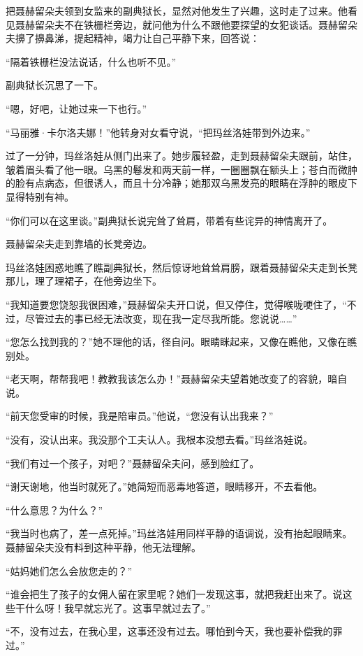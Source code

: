 \documentclass[12pt,UTF-8,openany]{ctexbook}
\begin{document}
\begin{normalsize}
    把聂赫留朵夫领到女监来的副典狱长，显然对他发生了兴趣，这时走了过来。他看见聂赫留朵夫不在铁栅栏旁边，就问他为什么不跟他要探望的女犯谈话。聂赫留朵夫擤了擤鼻涕，提起精神，竭力让自己平静下来，回答说：
    
    “隔着铁栅栏没法说话，什么也听不见。”
    
    副典狱长沉思了一下。
    
    “嗯，好吧，让她过来一下也行。”
    
    “马丽雅·卡尔洛夫娜！”他转身对女看守说，“把玛丝洛娃带到外边来。”
    
    过了一分钟，玛丝洛娃从侧门出来了。她步履轻盈，走到聂赫留朵夫跟前，站住，皱着眉头看了他一眼。乌黑的鬈发和两天前一样，一圈圈飘在额头上；苍白而微肿的脸有点病态，但很诱人，而且十分冷静；她那双乌黑发亮的眼睛在浮肿的眼皮下显得特别有神。
    
    “你们可以在这里谈。”副典狱长说完耸了耸肩，带着有些诧异的神情离开了。
    
    聂赫留朵夫走到靠墙的长凳旁边。
    
    玛丝洛娃困惑地瞧了瞧副典狱长，然后惊讶地耸耸肩膀，跟着聂赫留朵夫走到长凳那儿，理了理裙子，在他旁边坐下。
    
    “我知道要您饶恕我很困难，”聂赫留朵夫开口说，但又停住，觉得喉咙哽住了，“不过，尽管过去的事已经无法改变，现在我一定尽我所能。您说说……”
    
    “您怎么找到我的？”她不理他的话，径自问。眼睛眯起来，又像在瞧他，又像在瞧别处。
    
    “老天啊，帮帮我吧！教教我该怎么办！”聂赫留朵夫望着她改变了的容貌，暗自说。
    
    “前天您受审的时候，我是陪审员。”他说，“您没有认出我来？”
    
    “没有，没认出来。我没那个工夫认人。我根本没想去看。”玛丝洛娃说。
    
    “我们有过一个孩子，对吧？”聂赫留朵夫问，感到脸红了。
    
    “谢天谢地，他当时就死了。”她简短而恶毒地答道，眼睛移开，不去看他。
    
    “什么意思？为什么？”
    
    “我当时也病了，差一点死掉。”玛丝洛娃用同样平静的语调说，没有抬起眼睛来。聂赫留朵夫没有料到这种平静，他无法理解。
    
    “姑妈她们怎么会放您走的？”
    
    “谁会把生了孩子的女佣人留在家里呢？她们一发现这事，就把我赶出来了。说这些干什么呀！我早就忘光了。这事早就过去了。”
    
    “不，没有过去，在我心里，这事还没有过去。哪怕到今天，我也要补偿我的罪过。”
    

\end{normalsize}
\end{document}
